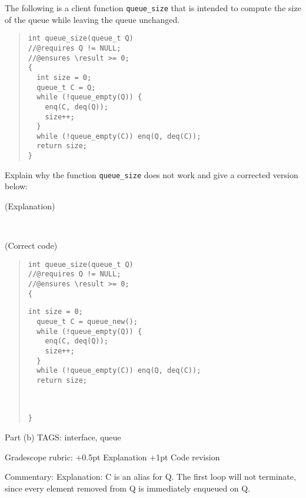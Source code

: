 \begin{parts}
The following is a client function \lstinline'queue_size' that is intended
to compute the size of the queue while leaving the queue unchanged.

\begin{quote}
\begin{lstlisting}[firstnumber=50]
int queue_size(queue_t Q)
//@requires Q != NULL;
//@ensures \result >= 0;
{
  int size = 0;
  queue_t C = Q;
  while (!queue_empty(Q)) {
    enq(C, deq(Q));
    size++;
  }
  while (!queue_empty(C)) enq(Q, deq(C));
  return size;
}
\end{lstlisting}
\end{quote}

\enlargethispage{5ex}
Explain why the function \lstinline'queue_size' does not work and give a
corrected version below:
\begin{framed}
(Explanation)

\medskip
{}\else~\vspace{1.2in}\fi
\end{framed}
\newpage
\begin{framed} (Correct code)
\begin{quote}
\begin{lstlisting}[firstnumber=50, belowskip=0pt]
int queue_size(queue_t Q)
//@requires Q != NULL;
//@ensures \result >= 0;
{
\end{lstlisting}
\ifprintanswers
\begin{lstlisting}[basicstyle=\basicstyle\color{\answerColor}]
  int size = 0;
  queue_t C = queue_new();
  while (!queue_empty(Q)) {
    enq(C, deq(Q));
    size++;
  }
  while (!queue_empty(C)) enq(Q, deq(C));
  return size;
\end{lstlisting}
\else~\vspace{6.5in}\fi
\begin{lstlisting}[aboveskip=0pt, belowskip=0pt]
}
\end{lstlisting}
\end{quote}
\end{framed}

\RUBRIC
Part (b)
TAGS: interface, queue

Gradescope rubric:
+0.5pt Explanation
+1pt Code revision

Commentary:
Explanation: C is an alias for Q. The first loop will not terminate,
since every element removed from Q is immediately enqueued on Q.


\end{parts}
